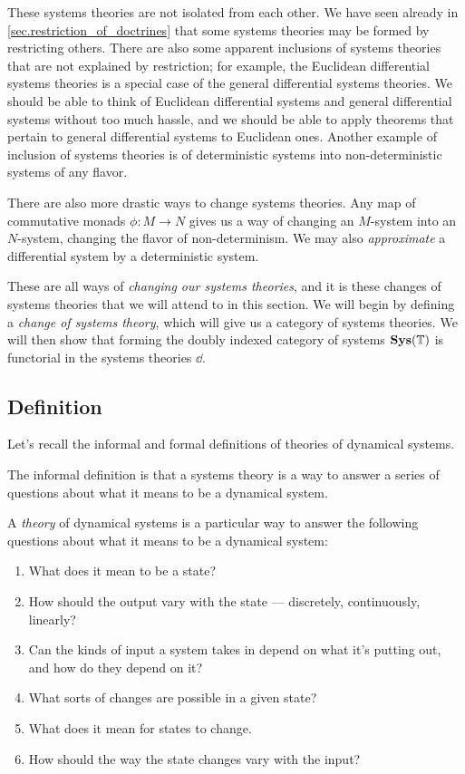 \documentclass[DynamicalBook]{subfiles}
\begin{document}
These systems theories are not isolated from each other. We have seen already in
\cref{sec.restriction_of_doctrines} that some systems theories may be formed by
restricting others. There are also some apparent inclusions of systems theories that
are not explained by restriction; for example, the Euclidean differential
systems theories is a special case of the general differential systems theories. We should be
able to think of Euclidean differential systems and general differential systems
without too much hassle, and we should be able to apply theorems that pertain to
general differential systems to Euclidean ones. Another example of inclusion of
systems theories is of deterministic systems into non-deterministic systems of any flavor.

There are also more drastic ways to change systems theories. Any map of commutative
monads $\phi : M \to N$ gives us a way of changing an $M$-system into an
$N$-system, changing the flavor of non-determinism. We may also
\emph{approximate} a differential system by a deterministic system. 

These are all ways of \emph{changing our systems theories}, and it is these changes of
systems theories that we will attend to in this section. We will begin by defining a \emph{change of systems theory}, which will give us a
category of systems theories. We will then show that forming the doubly indexed
category of systems $\textbf{Sys}(\mathbb{T})$ is functorial in the systems theories $\dd$.

\subsection{Definition}

Let's recall the informal and formal definitions of theories of dynamical systems.

The informal definition is that a systems theory is a way to answer a series of
questions about what it means to be a dynamical system.
\begin{informal}
  A \emph{theory} of dynamical systems is a particular way to answer the following
  questions about what it means to be a dynamical system:
  \begin{enumerate}
  \item What does it mean to be a state?
  \item How should the output vary with the state --- discretely,
    continuously, linearly?
  \item Can the kinds of input a
    system takes in depend on what it's putting out, and how do they depend on it?
  \item What sorts of changes are possible in a given state?
  \item What does it mean for states to change. 
  \item How should the way the state changes vary with the input?
  \end{enumerate}
\end{informal}
\end{document}
